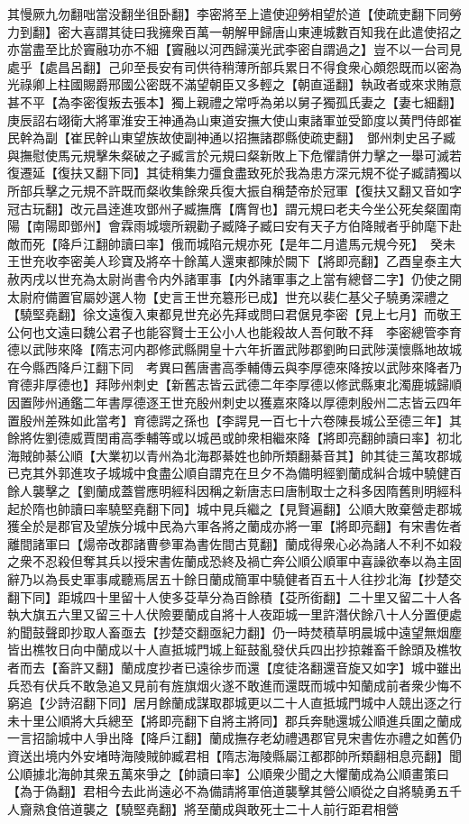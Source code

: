 其慢厥九勿翻咄當没翻坐徂卧翻】李密將至上遣使迎勞相望於道【使疏吏翻下同勞力到翻】密大喜謂其徒曰我擁衆百萬一朝解甲歸唐山東連城數百知我在此遣使招之亦當盡至比於竇融功亦不細【竇融以河西歸漢光武李密自謂過之】豈不以一台司見處乎【處昌呂翻】己卯至長安有司供待稍薄所部兵累日不得食衆心頗怨既而以密為光祿卿上柱國賜爵邢國公密既不滿望朝臣又多輕之【朝直遥翻】執政者或來求賄意甚不平【為李密復叛去張本】獨上親禮之常呼為弟以舅子獨孤氏妻之【妻七細翻】庚辰詔右翊衛大將軍淮安王神通為山東道安撫大使山東諸軍並受節度以黄門侍郎崔民幹為副【崔民幹山東望族故使副神通以招撫諸郡縣使疏吏翻】　鄧州刺史呂子臧與撫慰使馬元規擊朱粲破之子臧言於元規曰粲新敗上下危懼請併力擊之一舉可滅若復遷延【復扶又翻下同】其徒稍集力彊食盡致死於我為患方深元規不從子臧請獨以所部兵擊之元規不許既而粲收集餘衆兵復大振自稱楚帝於冠軍【復扶又翻又音如字冠古玩翻】改元昌逹進攻鄧州子臧撫膺【膺胷也】謂元規曰老夫今坐公死矣粲圍南陽【南陽即鄧州】會霖雨城壞所親勸子臧降子臧曰安有天子方伯降賊者乎帥麾下赴敵而死【降戶江翻帥讀曰率】俄而城陷元規亦死【是年二月遣馬元規今死】　癸未王世充收李密美人珍寶及將卒十餘萬人還東都陳於闕下【將即亮翻】乙酉皇泰主大赦丙戌以世充為太尉尚書令内外諸軍事【内外諸軍事之上當有總督二字】仍使之開太尉府備置官屬妙選人物【史言王世充簒形已成】世充以裴仁基父子驍勇深禮之【驍堅堯翻】徐文遠復入東都見世充必先拜或問曰君倨見李密【見上七月】而敬王公何也文遠曰魏公君子也能容賢士王公小人也能殺故人吾何敢不拜　李密總管李育德以武陟來降【隋志河内郡修武縣開皇十六年折置武陟郡劉昫曰武陟漢懷縣地故城在今縣西降戶江翻下同　考異曰舊唐書高季輔傳云與李厚德來降按以武陟來降者乃育德非厚德也】拜陟州刺史【新舊志皆云武德二年李厚德以修武縣東北濁鹿城歸順因置陟州通鑑二年書厚德逐王世充殷州刺史以獲嘉來降以厚德刺殷州二志皆云四年置殷州差殊如此當考】育德諤之孫也【李諤見一百七十六卷陳長城公至德三年】其餘將佐劉德威賈閏甫高季輔等或以城邑或帥衆相繼來降【將即亮翻帥讀曰率】初北海賊帥綦公順【大業初以青州為北海郡綦姓也帥所類翻綦音其】帥其徒三萬攻郡城已克其外郭進攻子城城中食盡公順自謂克在旦夕不為備明經劉蘭成糾合城中驍健百餘人襲擊之【劉蘭成蓋嘗應明經科因稱之新唐志曰唐制取士之科多因隋舊則明經科起於隋也帥讀曰率驍堅堯翻下同】城中見兵繼之【見賢遍翻】公順大敗棄營走郡城獲全於是郡官及望族分城中民為六軍各將之蘭成亦將一軍【將即亮翻】有宋書佐者離間諸軍曰【煬帝改郡諸曹參軍為書佐間古莧翻】蘭成得衆心必為諸人不利不如殺之衆不忍殺但奪其兵以授宋書佐蘭成恐終及禍亡奔公順公順軍中喜譟欲奉以為主固辭乃以為長史軍事咸聽焉居五十餘日蘭成簡軍中驍健者百五十人往抄北海【抄楚交翻下同】距城四十里留十人使多芟草分為百餘積【芟所銜翻】二十里又留二十人各執大旗五六里又留三十人伏險要蘭成自將十人夜距城一里許潛伏餘八十人分置便處約聞鼓聲即抄取人畜亟去【抄楚交翻亟紀力翻】仍一時焚積草明晨城中遠望無烟塵皆出樵牧日向中蘭成以十人直抵城門城上鉦鼓亂發伏兵四出抄掠雜畜千餘頭及樵牧者而去【畜許又翻】蘭成度抄者已遠徐步而還【度徒洛翻還音旋又如字】城中雖出兵恐有伏兵不敢急追又見前有旌旗烟火遂不敢進而還既而城中知蘭成前者衆少悔不窮追【少詩沼翻下同】居月餘蘭成謀取郡城更以二十人直抵城門城中人競出逐之行未十里公順將大兵總至【將即亮翻下自將主將同】郡兵奔馳還城公順進兵圍之蘭成一言招諭城中人爭出降【降戶江翻】蘭成撫存老幼禮遇郡官見宋書佐亦禮之如舊仍資送出境内外安堵時海陵賊帥臧君相【隋志海陵縣屬江都郡帥所類翻相息亮翻】聞公順據北海帥其衆五萬來爭之【帥讀曰率】公順衆少聞之大懼蘭成為公順畫策曰【為于偽翻】君相今去此尚遠必不為備請將軍倍道襲擊其營公順從之自將驍勇五千人齎熟食倍道襲之【驍堅堯翻】將至蘭成與敢死士二十人前行距君相營